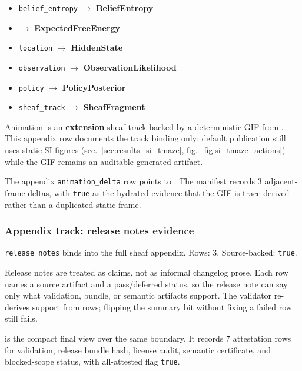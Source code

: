 \documentclass[
  english,
]{article}
\providecommand{\tightlist}{%
  \setlength{\itemsep}{0pt}\setlength{\parskip}{0pt}}
\begin{document}
\begin{itemize}
\tightlist
\item
  \texttt{belief\_entropy} \texorpdfstring{\ensuremath{\to}}{->} \textbf{BeliefEntropy}
\item
   \texorpdfstring{\ensuremath{\to}}{->} \textbf{ExpectedFreeEnergy}
\item
  \texttt{location} \texorpdfstring{\ensuremath{\to}}{->} \textbf{HiddenState}
\item
  \texttt{observation} \texorpdfstring{\ensuremath{\to}}{->} \textbf{ObservationLikelihood}
\item
  \texttt{policy} \texorpdfstring{\ensuremath{\to}}{->} \textbf{PolicyPosterior}
\item
  \texttt{sheaf\_track} \texorpdfstring{\ensuremath{\to}}{->} \textbf{SheafFragment}
\end{itemize}

Animation is an \textbf{extension} sheaf track backed by a deterministic
GIF from . This appendix row
documents the track binding only; default publication still uses static
SI figures (sec.~\ref{sec:results_si_tmaze},
fig.~\ref{fig:si_tmaze_actions}) while the GIF remains an auditable
generated artifact.

The appendix \texttt{animation\_delta} row points to
. The manifest records
3 adjacent-frame deltas, with \texttt{true} as the hydrated evidence
that the GIF is trace-derived rather than a duplicated static frame.

\subsubsection{Appendix track: release notes
evidence}\label{appendix-track-release-notes-evidence}

\texttt{release\_notes} binds
 into the full
sheaf appendix. Rows: 3. Source-backed: \texttt{true}.

Release notes are treated as claims, not as informal changelog prose.
Each row names a source artifact and a pass/deferred status, so the
release note can say only what validation, bundle, or semantic artifacts
support. The validator re-derives support from rows; flipping the
summary bit without fixing a failed row still fails.

 is the compact final
view over the same boundary. It records 7 attestation rows for
validation, release bundle hash, license audit, semantic certificate,
and blocked-scope status, with all-attested flag \texttt{true}.
\end{document}
